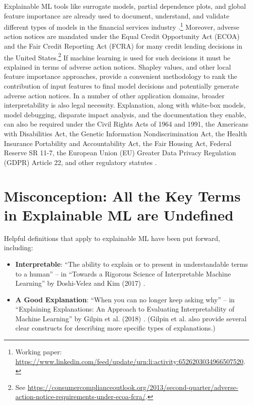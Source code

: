 \documentclass[fleqn]{article}
\begin{document}
Explainable ML tools like surrogate models, partial dependence plots, and global feature importance are already used to document, understand, and validate different types of models in the financial services industry \cite{lime-sup}.\footnote{Working paper: \url{https://www.linkedin.com/feed/update/urn:li:activity:6526203034966507520}.} Moreover, adverse action notices are mandated under the Equal Credit Opportunity Act (ECOA) and the Fair Credit Reporting Act (FCRA) for many credit lending decisions in the United States.\footnote{See \url{https://consumercomplianceoutlook.org/2013/second-quarter/adverse-action-notice-requirements-under-ecoa-fcra/}.} If machine learning is used for such decisions it must be explained in terms of adverse action notices. Shapley values, and other local feature importance approaches, provide a convenient methodology to rank the contribution of input features to final model decisions and potentially generate adverse action notices. In a number of other application domains, broader interpretability is also legal necessity. Explanation, along with white-box models, model debugging, disparate impact analysis, and the documentation they enable, can also be required under the Civil Rights Acts of 1964 and 1991, the Americans with Disabilities Act, the Genetic Information Nondiscrimination Act, the Health Insurance Portability and Accountability Act, the Fair Housing Act, Federal Reserve SR 11-7, the European Union (EU) Greater Data Privacy Regulation (GDPR) Article 22, and other regulatory statutes \cite{ff_interpretability}.

\section{Misconception: All the Key Terms in Explainable ML are Undefined}

Helpful definitions that apply to explainable ML have been put forward, including:

\begin{itemize}
\item \textbf{Interpretable}: ``The ability to explain or to present in understandable terms to a human'' -- in ``Towards a Rigorous Science of Interpretable Machine Learning'' by Doshi-Velez and Kim (2017) \cite{been_kim1}.
\item \textbf{A Good Explanation}: ``When you can no longer keep asking why'' -- in ``Explaining Explanations: An Approach to Evaluating Interpretability of Machine Learning'' by Gilpin et al. (2018) \cite{gilpin2018explaining}. (Gilpin et al. also provide several clear constructs for describing more specific types of explanations.) 
\end{itemize}
\end{document}
